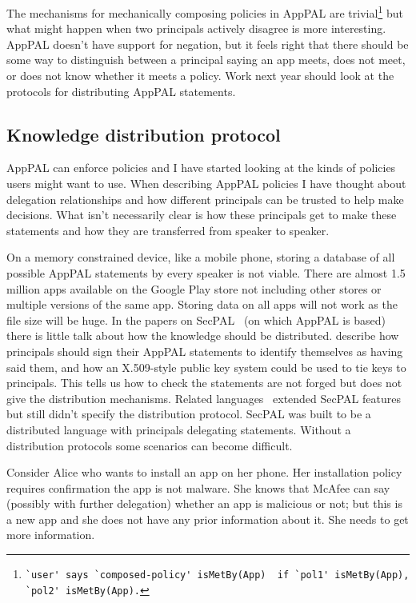 \documentclass[a4paper]{scrartcl}
\begin{document}
The mechanisms for mechanically composing policies in AppPAL are trivial\footnote{\lstinline{`user' says `composed-policy' isMetBy(App)  if `pol1' isMetBy(App), `pol2' isMetBy(App).}} but what might happen when two principals actively disagree is more interesting.
AppPAL doesn't have support for negation, but it feels right that there should be some way to distinguish between a principal saying an app meets, does not meet, or does not know whether it meets a policy.
Work next year should look at the protocols for distributing AppPAL statements.

\subsection{Knowledge distribution protocol}
\label{ssec:kdp}

AppPAL can enforce policies and I have started looking at the kinds of policies users might want to use.
When describing AppPAL policies I have thought about delegation relationships and how different principals can be trusted to help make decisions.
What isn't necessarily clear is how these principals get to make these statements and how they are transferred from speaker to speaker.

On a memory constrained device, like a mobile phone, storing a database of all possible AppPAL statements by every speaker is not viable.
There are almost 1.5 million apps available on the Google Play store not including other stores or multiple versions of the same app.
Storing data on all apps will not work as the file size will be huge.
In the papers on SecPAL~\citep{Becker:2006vh,Becker:2009vt} (on which AppPAL is based) there is little talk about how the knowledge should be distributed.
\citeauthor*{Becker:2006vh} describe how principals should sign their AppPAL statements to identify themselves as having said them, and how an X.509-style public key system could be used to tie keys to principals.
This tells us how to check the statements are not forged but does not give the distribution mechanisms.
Related languages~\citep{Becker:2009ula,Aziz:2011vt,Gurevich:2008fz,Gurevich:Qo5E3M3} extended SecPAL features but still didn't specify the distribution protocol.
SecPAL was built to be a distributed language with principals delegating statements.
Without a distribution protocols some scenarios can become difficult.

Consider Alice who wants to install an app on her phone.
Her installation policy requires confirmation the app is not malware.
She knows that McAfee can say (possibly with further delegation) whether an app is malicious or not;
  but this is a new app and she does not have any prior information about it.
She needs to get more information.
\end{document}
